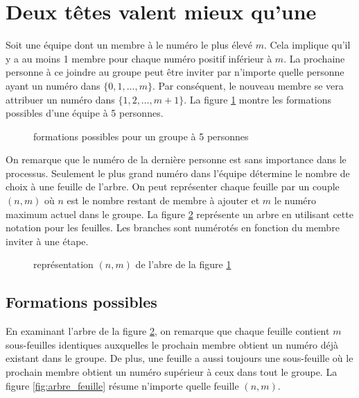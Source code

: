 \documentclass[11pt]{article}
\begin{document}
\pagebreak
{}
\inputminted[linenos]{haskell}{avion/src/Main.hs}
\vspace{1cm}
\begin{multicols}{2}
    \inputminted[linenos,fontsize=\footnotesize]{C}{avion/main.c}
\end{multicols}
\restoregeometry


\pagebreak
\section{Deux têtes valent mieux qu’une}
Soit une équipe dont un membre à le numéro le plus élevé $m$. Cela implique qu'il
y a au moins 1 membre pour chaque numéro positif inférieur à $m$. La prochaine
personne à ce joindre au groupe peut être inviter par n'importe quelle personne
ayant un numéro dans $\{0,1,\dots,m\}$. Par conséquent, le nouveau membre
se vera attribuer un numéro dans $\{1,2,\dots,m+1\}$. La figure \ref{fig:arbre_comb}
montre les formations possibles d'une équipe à 5 personnes.

\begin{figure}[H]
    \centering
    
    \caption{formations possibles pour un groupe à 5 personnes}
    \label{fig:arbre_comb}
\end{figure}

On remarque que le numéro de la dernière personne est sans importance dans
le processus. Seulement le plus grand numéro dans l'équipe détermine le nombre
de choix à une feuille de l'arbre. On peut représenter chaque feuille par un
couple $(n,m)$ où $n$ est le nombre restant de membre à ajouter et $m$ le numéro
maximum actuel dans le groupe. La figure \ref{fig:arbre_comb_state} représente
un arbre en utilisant cette notation pour les feuilles. Les branches sont
numérotés en fonction du membre inviter à une étape.

\begin{figure}[H]
    \centering
    
    \caption{représentation $(n,m)$ de l'abre de la figure \ref{fig:arbre_comb}}
    \label{fig:arbre_comb_state}
\end{figure}

\subsection{Formations possibles}
En examinant l'arbre de la figure \ref{fig:arbre_comb_state}, on remarque que
chaque feuille contient $m$ sous-feuilles identiques auxquelles le prochain
membre obtient un numéro déjà existant dans le groupe. De plus, une feuille a
aussi toujours une sous-feuille où le prochain membre obtient un numéro supérieur
à ceux dans tout le groupe. La figure \ref{fig:arbre_feuille} résume n'importe
quelle feuille $(n,m)$.
\end{document}
